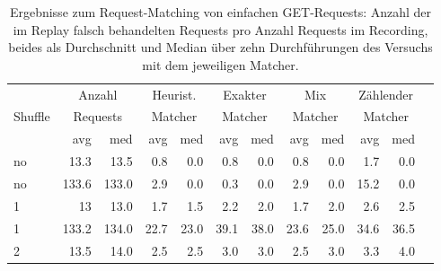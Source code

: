 \documentclass[12pt,a4paper]{report}
\begin{document}
\begin{table}[H]
	\centering
	\caption[Ergebnisse zum Request-Matching von einfachen GET-Requests]{
		Ergebnisse zum Request-Matching von einfachen GET-Requests:
		Anzahl der im Replay falsch behandelten Requests pro Anzahl Requests im Recording,
		beides als Durchschnitt und Median über zehn Durchführungen des Versuchs mit dem jeweiligen Matcher.
	}
	\label{tab:get}
	\begin{tabular}{|l|r|r|r|r|r|r|r|r|r|r|r|}
		\hline
		\multirow{3}{*}{Shuffle} & \multicolumn{2}{|c|}{Anzahl}   & \multicolumn{2}{|c|}{Heurist.} & \multicolumn{2}{|c|}{Exakter} & \multicolumn{2}{|c|}{Mix}     & \multicolumn{2}{|c|}{Zählender}                                    \\
		                         & \multicolumn{2}{|c|}{Requests} & \multicolumn{2}{|c|}{Matcher}  & \multicolumn{2}{|c|}{Matcher} & \multicolumn{2}{|c|}{Matcher} & \multicolumn{2}{|c|}{Matcher}                                      \\ \cline{2-11}
		                         & avg                            & med                            & avg                           & med                           & avg                             & med  & avg  & med  & avg  & med  \\ \hline
		no                       & 13.3                           & 13.5                           & 0.8                           & 0.0                           & 0.8                             & 0.0  & 0.8  & 0.0  & 1.7  & 0.0  \\ \hline
		no                       & 133.6                          & 133.0                          & 2.9                           & 0.0                           & 0.3                             & 0.0  & 2.9  & 0.0  & 15.2 & 0.0  \\ \hline
		1                        & 13                             & 13.0                           & 1.7                           & 1.5                           & 2.2                             & 2.0  & 1.7  & 2.0  & 2.6  & 2.5  \\ \hline
		1                        & 133.2                          & 134.0                          & 22.7                          & 23.0                          & 39.1                            & 38.0 & 23.6 & 25.0 & 34.6 & 36.5 \\ \hline
		2                        & 13.5                           & 14.0                           & 2.5                           & 2.5                           & 3.0                             & 3.0  & 2.5  & 3.0  & 3.3  & 4.0  \\ \hline

\end{tabular}
\end{table}
\end{document}
